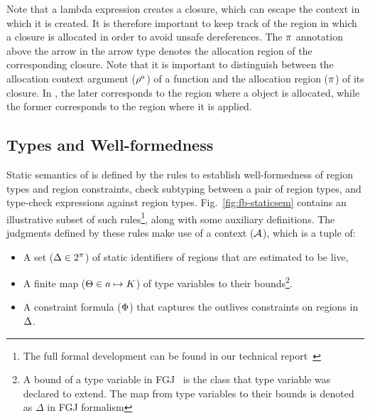 Note that a lambda expression creates a closure, which can escape the
context in which it is created. It is therefore important to keep track of
the region in which a closure is allocated in order to avoid unsafe
dereferences. The $\pi$ annotation above the arrow in the arrow
type denotes the allocation region of the corresponding closure. Note
that it is important to distinguish between the allocation context
argument ($\rho^a$) of a function and the allocation region
($\pi$) of its closure. In \name, the later corresponds to the region where
a  object is allocated, while the former corresponds to the
region where it is applied. 


\subsection{Types and Well-formedness}

Static semantics of \fbname is defined by the rules to establish
well-formedness of region types and region constraints, check
subtyping between a pair of region types, and type-check expressions
against region types. Fig.~\ref{fig:fb-staticsem} contains an
illustrative subset of such rules\footnote{The full formal development
can be found in our technical report~\cite{techrep}}, along with some
auxiliary definitions. The judgments defined by these rules make use
of a context (${\mathcal{A}}$), which is a tuple of:
\begin{itemize}
\item A set ($\Delta \in 2^\pi$) of static identifiers of regions
that are estimated to be live,
\item A finite map ($\Theta \in a \mapsto K$) of type
variables to their bounds\footnote{A bound of a type variable in
FGJ~\cite{fgj} is the class that type variable was declared to extend.
The map from type variables to their bounds is denoted as $\Delta$
in FGJ formalism}.
\item A constraint formula ($\Phi$) that captures the outlives
constraints on regions in $\Delta$.
\end{itemize}

